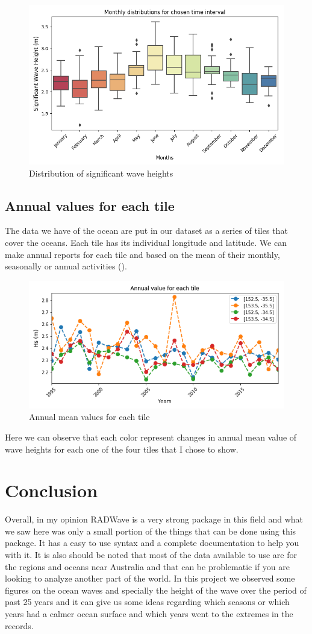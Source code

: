 \documentclass[12pt]{article}
\begin{document}
\begin{figure}[h]
    \centering
    \includegraphics[width=6.5 cm]{whall_wh_distribution.png}
    \caption{Distribution of significant wave heights}
    \label{fig:fig6}
\end{figure}

\newpage

\subsection{Annual values for each tile}
The data we have of the ocean are put in our dataset as a series of tiles that cover the oceans. Each tile has its individual longitude and latitude. We can make annual reports for each tile and based on the mean of their monthly, seasonally or annual activities (). 

\begin{figure}[h]
    \centering
    \includegraphics[width=12 cm]{annual_value.png}
    \caption{Annual mean values for each tile}
    \label{fig:fig7}
\end{figure}
 Here we can observe that each color represent changes in annual mean value of wave heights for each one of the four tiles that I chose to show.
 
\section{Conclusion}
Overall, in my opinion RADWave is a very strong package in this field and what we saw here was only a small portion of the  things that can be done using this package. It has a easy to use syntax and a complete documentation to help you with it. It is also should be noted that most of the data available to use are for the regions and oceans near Australia and that can be problematic if you are looking to analyze another part of the world. 
\newline In this project we observed some figures on the ocean waves and specially the height of the wave over the period of past 25 years and it can give us some ideas regarding which seasons or which years had a calmer ocean surface and which years went to the extremes in the records.
\newpage
\end{document}
